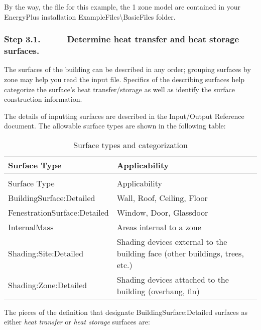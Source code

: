 By the way, the file for this example, the 1 zone model are contained in your EnergyPlus installation ExampleFiles\textbackslash{}BasicFiles folder.

\subsubsection{Step 3.1.~~~~~ Determine heat transfer and heat storage surfaces.}\label{step-3.1.-determine-heat-transfer-and-heat-storage-surfaces.}

The surfaces of the building can be described in any order; grouping surfaces by zone may help you read the input file. Specifics of the describing surfaces help categorize the surface's heat transfer/storage as well as identify the surface construction information.

The details of inputting surfaces are described in the Input/Output Reference document. The allowable surface types are shown in the following table:

\begin{longtable}[c]{p{1.91in}p{4.08in}}
\caption{Surface types and categorization \label{table:surface-types-and-categorization}} \tabularnewline
\toprule 
Surface Type & Applicability \tabularnewline
\midrule
\endfirsthead

\caption[]{Surface types and categorization} \tabularnewline
\toprule 
Surface Type & Applicability \tabularnewline
\midrule
\endhead

BuildingSurface:Detailed & Wall, Roof, Ceiling, Floor \tabularnewline
FenestrationSurface:Detailed & Window, Door, Glassdoor \tabularnewline
InternalMass & Areas internal to a zone \tabularnewline
Shading:Site:Detailed & Shading devices external to the building face (other buildings, trees, etc.) \tabularnewline
Shading:Zone:Detailed & Shading devices attached to the building (overhang, fin) \tabularnewline
\bottomrule
\end{longtable}

The pieces of the definition that designate BuildingSurface:Detailed surfaces as either \emph{heat transfer} or \emph{heat storage} surfaces are:


